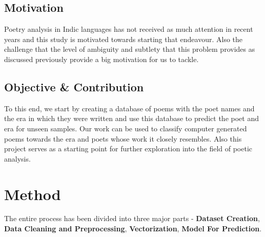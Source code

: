 \documentclass[11pt,a4paper]{article}
\begin{document}
\subsection{Motivation}
Poetry analysis in Indic languages has not received as much attention in recent years and this study is motivated towards starting that endeavour. Also the challenge that the level of ambiguity and subtlety that this problem provides as discussed previously provide a big motivation for us to tackle. 

\subsection{Objective \& Contribution}
 To this end, we start by creating a database of poems with the poet names and the era in which they were written and use this database to predict the poet and era for unseen samples. Our work can be used to classify computer generated poems towards the era and poets whose work it closely resembles. Also this project serves as a starting point for further exploration into the field of poetic analysis.

\section{Method}

The entire process has been divided into three major parts - \textbf{Dataset Creation}, \textbf{Data Cleaning and Preprocessing}, \textbf{Vectorization}, \textbf{Model For Prediction}.
\end{document}
